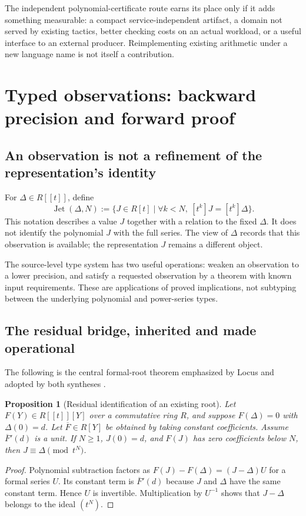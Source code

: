 \documentclass[11pt,letterpaper]{article}
\newtheorem{proposition}[definition]{Proposition}
\theoremstyle{remark}
\begin{document}
The independent polynomial-certificate route earns its place only if it adds
something measurable: a compact service-independent artifact, a domain not
served by existing tactics, better checking costs on an actual workload, or a
useful interface to an external producer. Reimplementing existing arithmetic
under a new language name is not itself a contribution.

\section{Typed observations: backward precision and forward proof}\label{sec:jets}

\subsection{An observation is not a refinement of the representation's identity}
For $\Delta\in R[[t]]$, define
\[
 \operatorname{Jet}(\Delta,N)
   :=\{J\in R[t]\mid\forall k<N,\ [t^k]J=[t^k]\Delta\}.
\]
This notation describes a value $J$ together with a relation to the fixed
$\Delta$. It does not identify the polynomial $J$ with the full series. The
view of $\Delta$ records that this observation is available; the representation
$J$ remains a different object.

The source-level type system has two useful operations: weaken an observation
to a lower precision, and satisfy a requested observation by a theorem with
known input requirements. These are applications of proved implications, not
subtyping between the underlying polynomial and power-series types.

\subsection{The residual bridge, inherited and made operational}
The following is the central formal-root theorem emphasized by Locus and
adopted by both syntheses \cite{syn,workbenches}.

\begin{proposition}[Residual identification of an existing root]\label{prop:residual}
Let $F(Y)\in R[[t]][Y]$ over a commutative ring $R$, and suppose
$F(\Delta)=0$ with $\Delta(0)=d$. Let $\overline F\in R[Y]$ be obtained by
taking constant coefficients. Assume $\overline F'(d)$ is a unit. If $N\ge1$,
$J(0)=d$, and $F(J)$ has zero coefficients below $N$, then
$J\equiv\Delta\pmod{t^N}$.
\end{proposition}
\begin{proof}
Polynomial subtraction factors as
$F(J)-F(\Delta)=(J-\Delta)U$ for a formal series $U$.
Its constant term is $\overline F'(d)$ because $J$ and $\Delta$ have the same
constant term. Hence $U$ is invertible. Multiplication by $U^{-1}$ shows that
$J-\Delta$ belongs to the ideal $(t^N)$.
\end{proof}
\end{document}
